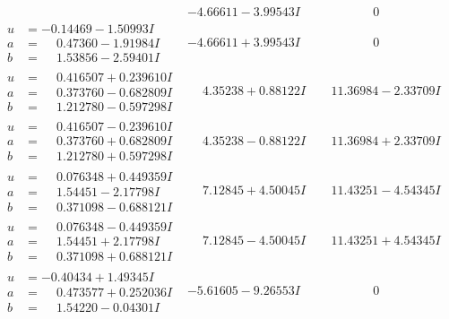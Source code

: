 \documentclass[1p]{elsarticle_modified}
\theoremstyle{definition}
\begin{document}
$$\begin{array}{c|c|c}
 & -4.66611 - 3.99543 I & \phantom{-0.000000 } 0 \\ \hline\begin{aligned}
u &= -0.14469 - 1.50993 I \\
a &= \phantom{-}0.47360 - 1.91984 I \\
b &= \phantom{-}1.53856 - 2.59401 I\end{aligned}
 & -4.66611 + 3.99543 I & \phantom{-0.000000 } 0 \\ \hline\begin{aligned}
u &= \phantom{-}0.416507 + 0.239610 I \\
a &= \phantom{-}0.373760 - 0.682809 I \\
b &= \phantom{-}1.212780 - 0.597298 I\end{aligned}
 & \phantom{-}4.35238 + 0.88122 I & \phantom{-}11.36984 - 2.33709 I \\ \hline\begin{aligned}
u &= \phantom{-}0.416507 - 0.239610 I \\
a &= \phantom{-}0.373760 + 0.682809 I \\
b &= \phantom{-}1.212780 + 0.597298 I\end{aligned}
 & \phantom{-}4.35238 - 0.88122 I & \phantom{-}11.36984 + 2.33709 I \\ \hline\begin{aligned}
u &= \phantom{-}0.076348 + 0.449359 I \\
a &= \phantom{-}1.54451 - 2.17798 I \\
b &= \phantom{-}0.371098 - 0.688121 I\end{aligned}
 & \phantom{-}7.12845 + 4.50045 I & \phantom{-}11.43251 - 4.54345 I \\ \hline\begin{aligned}
u &= \phantom{-}0.076348 - 0.449359 I \\
a &= \phantom{-}1.54451 + 2.17798 I \\
b &= \phantom{-}0.371098 + 0.688121 I\end{aligned}
 & \phantom{-}7.12845 - 4.50045 I & \phantom{-}11.43251 + 4.54345 I \\ \hline\begin{aligned}
u &= -0.40434 + 1.49345 I \\
a &= \phantom{-}0.473577 + 0.252036 I \\
b &= \phantom{-}1.54220 - 0.04301 I\end{aligned}
 & -5.61605 - 9.26553 I & \phantom{-0.000000 } 0 \\ \hline\begin{aligned}

\end{aligned}
\end{array}$$
\end{document}

